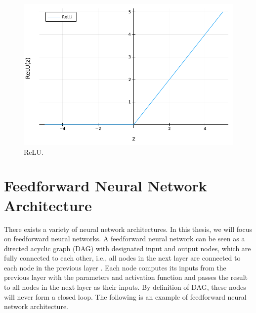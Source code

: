 \documentclass[
	parskip, 			   %
	twoside, 			   %
	DIV=14, 			   %
	BCOR=15.0mm, 		   %
	headsepline, 		   %
	open=right, 		   %
	captions=tableheading, %
	bibliography=totoc,    %
	numbers=noenddot       %
]{scrreprt}
\begin{document}
\begin{figure}[h!]
    \centering
    \includegraphics[scale=0.6]{figures/ReLU.pdf}
    \caption{ReLU.}
    \label{fig:ReLU}
\end{figure}


\section{Feedforward Neural Network Architecture}
There exists a variety of neural network architectures. In this thesis, we will focus on feedforward neural networks. A feedforward neural network can be seen as a directed acyclic graph (DAG) with designated input and output nodes, which are fully connected to each other, i.e., all nodes in the next layer are connected to each node in the previous layer \cite{russell2010artificial}. Each node computes its inputs from the previous layer with the parameters and activation function and passes the result to all nodes in the next layer as their inputs. By definition of DAG, these nodes will never form a closed loop. The following is an example of feedforward neural network architecture.
\end{document}
